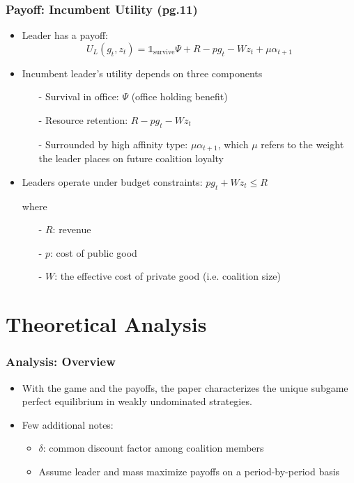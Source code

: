 \documentclass[10pt,handout]{beamer}
\begin{document}
\begin{frame}
\frametitle{Payoff: Incumbent Utility (pg.11)}
\begin{itemize}
    \item Leader has a payoff:
    \[
        U_L(g_t, z_t) = \mathbb{1}_{\text{survive}}\Psi + R - pg_t - Wz_t + \mu\alpha_{t+1}
    \]
    \item Incumbent leader's utility depends on three components
    \begin{itemize}
        \item[-] Survival in office: $\Psi$ (office holding benefit)
        \item[-] Resource retention: $R - pg_t - W z_t$
        \item[-] Surrounded by high affinity type: $\mu \alpha_{t+1}$, which $\mu$ refers to the weight the leader places on future coalition loyalty
    \end{itemize}
    \item Leaders operate under budget constraints: $p g_t + Wz_t \leq R$
    \item[] where 
    \begin{itemize}
        \item[-] $R$: revenue 
        \item[-] $p$: cost of public good 
        \item[-] $W$: the effective cost of private good (i.e. coalition size)
    \end{itemize}
\end{itemize}
\end{frame}

\section{Theoretical Analysis}
\begin{frame}
\frametitle{Analysis: Overview}
\begin{itemize}
    \item With the game and the payoffs, the paper characterizes the unique subgame perfect equilibrium in weakly undominated strategies.
    \item Few additional notes:
    \begin{itemize}
        \item $\delta$: common discount factor among coalition members
        \item Assume leader and mass maximize payoffs on a period-by-period basis
    \end{itemize}
\end{itemize}
\end{frame}
\end{document}
